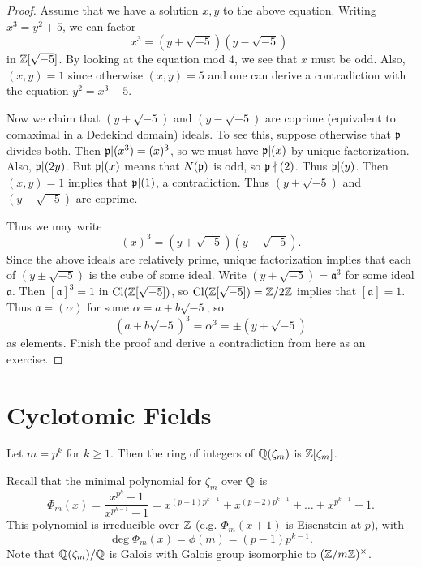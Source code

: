 \begin{proof}
  Assume that we have a solution $x, y$ to the
  above equation. Writing $x^3 = y^2 + 5$, we
  can factor
  \[
    x^3 = (y + \sqrt{-5})(y - \sqrt{-5}).
  \]
  in $\mathbb{Z}[\sqrt{-5}]$. By looking at the equation
  mod $4$, we see that $x$ must be odd.
  Also, $(x, y) = 1$ since otherwise $(x, y) = 5$
  and one can derive a contradiction with the
  equation $y^2 = x^3 - 5$.

  Now we claim that
  $(y + \sqrt{-5})$ and $(y - \sqrt{-5})$ are
  coprime (equivalent to comaximal in a Dedekind
  domain) ideals. To see this, suppose otherwise
  that $\mathfrak{p}$ divides both. Then $\mathfrak{p} | (x^3) = (x)^3$,
  so we must have $\mathfrak{p} | (x)$ by unique factorization.
  Also, $\mathfrak{p} | (2y)$. But $\mathfrak{p} | (x)$ means that
  $N(\mathfrak{p})$ is odd, so $\mathfrak{p} \nmid (2)$. Thus
  $\mathfrak{p} | (y)$. Then $(x, y) = 1$ implies that
  $\mathfrak{p} | (1)$, a contradiction. Thus
  $(y + \sqrt{-5})$ and $(y - \sqrt{-5})$ are
  coprime.

  Thus we may write
  \[
    (x)^3 = (y + \sqrt{-5})(y - \sqrt{-5}).
  \]
  Since the above ideals are relatively prime,
  unique factorization implies that each of
  $(y \pm \sqrt{-5})$ is the cube of some ideal. 
  Write $(y + \sqrt{-5}) = \mathfrak{a}^3$ for some ideal
  $\mathfrak{a}$. Then $[\mathfrak{a}]^3 = 1$
  in $\operatorname{Cl}(\mathbb{Z}[\sqrt{-5}])$, so
  $\operatorname{Cl}(\mathbb{Z}[\sqrt{-5}]) = \mathbb{Z} / 2\mathbb{Z}$ implies that
  $[\mathfrak{a}] = 1$. Thus $\mathfrak{a} = (\alpha)$
  for some $\alpha = a + b \sqrt{-5}$, so
  \[
    (a + b \sqrt{-5})^3
    = \alpha^3 = \pm (y + \sqrt{-5})
  \]
  as elements. Finish the proof and derive a
  contradiction from here as an exercise.
\end{proof}

\section{Cyclotomic Fields}

\begin{theorem}
  Let $m = p^k$ for $k \ge 1$. Then the ring of
  integers of $\mathbb{Q}(\zeta_m)$ is $\mathbb{Z}[\zeta_m]$.
\end{theorem}

\begin{remark}
  Recall that the minimal polynomial for
  $\zeta_m$ over $\mathbb{Q}$ is
  \[
    \Phi_m(x) = \frac{x^{p^k} - 1}{x^{p^{k - 1}} - 1}
    = x^{(p - 1)p^{k - 1}} + x^{(p - 2)p^{k - 1}} + \dots + x^{p^{k - 1}} + 1.
  \]
  This polynomial is irreducible
  over $\mathbb{Z}$ (e.g. $\Phi_m(x + 1)$ is Eisenstein at $p$),
  with
  \[
    \deg \Phi_m(x) = \phi(m) = (p - 1)p^{k - 1}.
  \]
  Note that $\mathbb{Q}(\zeta_m) / \mathbb{Q}$ is Galois
  with Galois group isomorphic to $(\mathbb{Z} / m\mathbb{Z})^\times$.
\end{remark}

